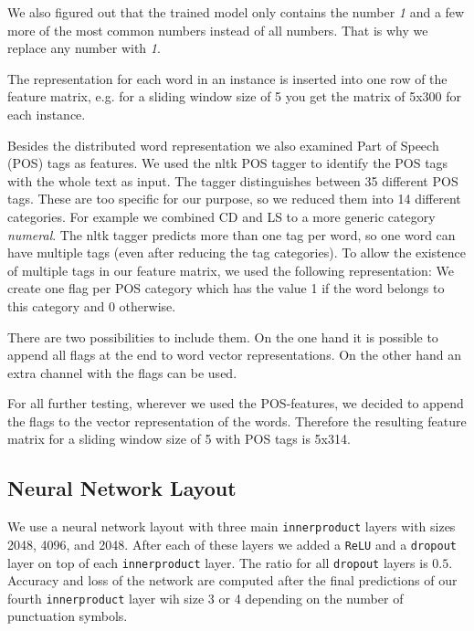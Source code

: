 We also figured out that the trained model only contains the number \emph{1} and a few more of the most common numbers instead of all numbers. 
That is why we replace any number with \emph{1}.

The representation for each word in an instance is inserted into one row of the feature matrix, e.g. for a sliding window size of 5 you get the matrix of 5x300 for each instance.

Besides the distributed word representation we also examined Part of Speech (POS) tags as features.
We used the nltk POS tagger to identify the POS tags with the whole text as input.
The tagger distinguishes between 35 different POS tags.
These are too specific for our purpose, so we reduced them into 14 different categories.
For example we combined CD and LS to a more generic category \emph{numeral}.
The nltk tagger predicts more than one tag per word, so one word can have multiple tags (even after reducing the tag categories).
To allow the existence of multiple tags in our feature matrix, we used the following representation:
We create one flag per POS category which has the value 1 if the word belongs to this category and 0 otherwise.

There are two possibilities to include them.
On the one hand it is possible to append all flags at the end to word vector representations.
On the other hand an extra channel with the flags can be used.

For all further testing, wherever we used the POS-features, we decided to append the flags to the vector representation of the words.
Therefore the resulting feature matrix for a sliding window size of 5 with POS tags is 5x314.



\subsection{Neural Network Layout}

We use a neural network layout with three main \texttt{innerproduct} layers with sizes 2048, 4096, and 2048.
After each of these layers we added a \texttt{ReLU} and a \texttt{dropout} layer on top of each \texttt{innerproduct} layer.
The ratio for all \texttt{dropout} layers is $0.5$.
Accuracy and loss of the network are computed after the final predictions of our fourth \texttt{innerproduct} layer wih size 3 or 4 depending on the number of punctuation symbols.

